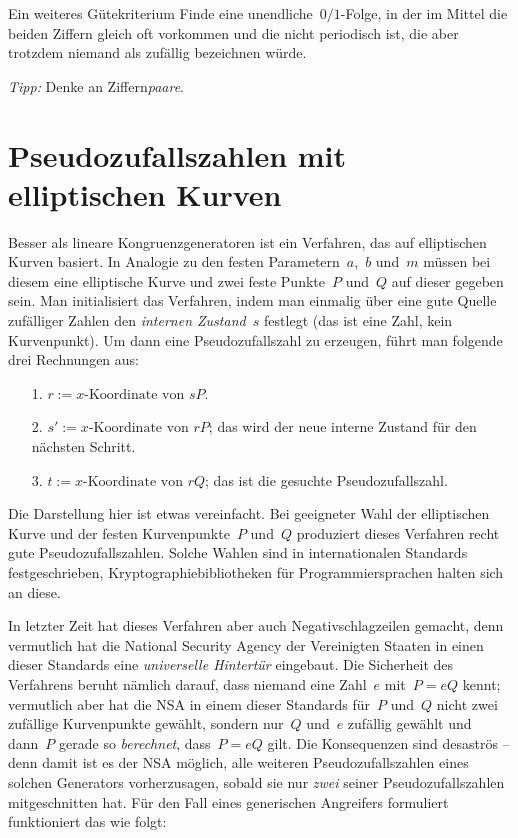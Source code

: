\documentclass{zirkelblatt}
\newcommand{\head}[1]{\section*{\rmfamily #1}}%
\begin{document}
\begin{aufgabeShaded}{Ein weiteres Gütekriterium}
Finde eine unendliche~$0/1$-Folge, in der im Mittel die beiden Ziffern gleich
oft vorkommen und die nicht periodisch ist, die aber trotzdem niemand als
zufällig bezeichnen würde.

\emph{Tipp:} Denke an Ziffern\emph{paare}.
\end{aufgabeShaded}


\head{Pseudozufallszahlen mit elliptischen Kurven}

Besser als lineare Kongruenzgeneratoren ist ein Verfahren, das auf elliptischen
Kurven basiert. In Analogie zu den festen Parametern~$a$,~$b$ und~$m$ müssen bei
diesem eine elliptische Kurve und zwei feste Punkte~$P$ und~$Q$ auf dieser
gegeben sein. Man initialisiert das Verfahren, indem man einmalig über eine
gute Quelle zufälliger Zahlen den \emph{internen Zustand~$s$} festlegt (das ist
eine Zahl, kein Kurvenpunkt). Um dann eine Pseudozufallszahl zu erzeugen,
führt man folgende drei Rechnungen aus:

\begin{enumerate}
\item[1.] $r := \text{$x$-Koordinate von~$sP$}$.
\item[2.] $s' := \text{$x$-Koordinate von~$rP$}$; das wird der neue interne Zustand
für den nächsten Schritt.
\item[3.] $t := \text{$x$-Koordinate von~$rQ$}$; das ist die gesuchte
Pseudozufallszahl.
\end{enumerate}

Die Darstellung hier ist etwas vereinfacht. Bei geeigneter Wahl der
elliptischen Kurve und der festen Kurvenpunkte~$P$ und~$Q$ produziert dieses
Verfahren recht gute Pseudozufallszahlen. Solche Wahlen sind in internationalen
Standards festgeschrieben, Kryptographiebibliotheken für Programmiersprachen
halten sich an diese.

In letzter Zeit hat dieses Verfahren aber auch Negativschlagzeilen gemacht,
denn vermutlich hat die National Security Agency der Vereinigten Staaten in
einen dieser Standards eine \emph{universelle Hintertür} eingebaut. Die
Sicherheit des Verfahrens beruht nämlich darauf, dass niemand eine Zahl~$e$
mit~$P = eQ$ kennt; vermutlich aber hat die NSA in einem dieser Standards
für~$P$ und~$Q$ nicht zwei zufällige Kurvenpunkte gewählt, sondern nur~$Q$
und~$e$ zufällig gewählt und dann~$P$ gerade so \emph{berechnet}, dass~$P = eQ$
gilt. Die Konsequenzen sind desaströs -- denn damit ist es der NSA möglich,
alle weiteren Pseudozufallszahlen eines solchen Generators vorherzusagen,
sobald sie nur \emph{zwei} seiner Pseudozufallszahlen mitgeschnitten hat.
Für den Fall eines generischen Angreifers formuliert funktioniert das wie folgt:
\end{document}
